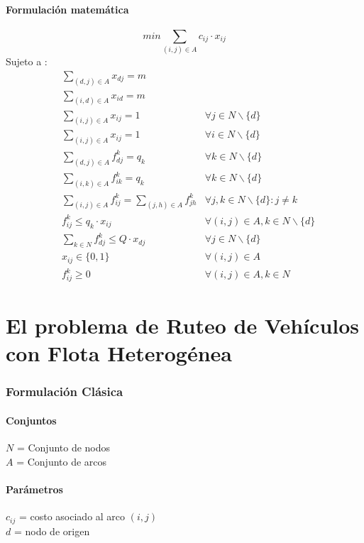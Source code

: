 \documentclass{article}
\numberwithin{equation}{section}
\begin{document}
\subsection{Formulación matemática}
\begin{equation}
min \sum_{(i,j) \in A} c_{ij} \cdot x_{ij}
\end{equation}
Sujeto a : \begin{align}
& \sum_{(d,j) \in A} x_{dj} = m \\
& \sum_{(i,d) \in A} x_{id} = m \\
& \sum_{(i,j) \in A} x_{ij} = 1 &\forall j \in N\backslash \{d\} \\
& \sum_{(i,j) \in A} x_{ij} = 1 &\forall i \in N\backslash \{d\} \\
& \sum_{(d,j) \in A} f_{dj}^k = q_{k} &\forall k \in N\backslash \{d\} \\
& \sum_{(i,k) \in A} f_{ik}^k = q_{k} &\forall k \in N\backslash \{d\} \\
& \sum_{(i,j) \in A} f_{ij}^k = \sum_{(j,h) \in A} f_{jh}^k &\forall j,k \in N\backslash \{d\} : j \neq k \\
& f_{ij}^k \leq q_{k} \cdot x_{ij} &\forall (i,j) \in A, k \in N\backslash \{d\}\\
& \sum_{k \in N} f_{dj}^k \leq Q \cdot x_{dj} &\forall j \in N\backslash \{d\}\\
& x_{ij} \in \{0,1\} &\forall (i,j) \in A\\
& f_{ij}^k \geq 0 &\forall (i,j) \in A, k \in N
\end{align}

\newpage
\part{El problema de Ruteo de Vehículos con Flota Heterogénea}
\section{Formulación Clásica}
\subsection{Conjuntos}
$N$ = Conjunto de nodos\\
$A$ = Conjunto de arcos
\subsection{Parámetros}
$c_{ij}$ = costo asociado al arco $(i,j)$\\
$d$ = nodo de origen
\end{document}
